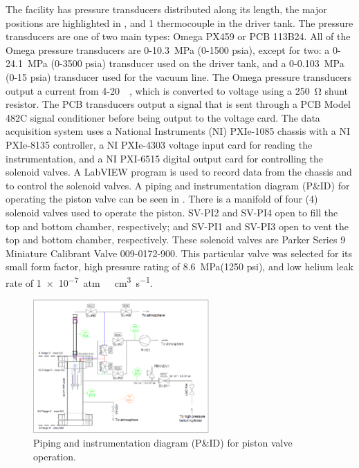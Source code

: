 The facility has pressure transducers distributed along its length, the major positions are highlighted in , and 1 thermocouple in the driver tank. The pressure transducers are one of two main types: Omega PX459 or PCB 113B24. All of the Omega pressure transducers are 0-\SI{10.3}{\mega\pascal} (0-1500 psia), except for two: a 0-\SI{24.1}{\mega\pascal} (0-3500 psia) transducer used on the driver tank, and a 0-\SI{0.103}{\mega\pascal} (0-15 psia) transducer used for the vacuum line. The Omega pressure transducers output a current from 4-\SI{20}{\milli\amp}, which is converted to voltage using a \SI{250}{\ohm} shunt resistor. The PCB transducers output a signal that is sent through a PCB Model 482C signal conditioner before being output to the voltage card. The data acquisition system uses a National Instruments (NI) PXIe-1085 chassis with a NI PXIe-8135 controller, a NI PXIe-4303 voltage input card for reading the instrumentation, and a NI PXI-6515 digital output card for controlling the solenoid valves. A LabVIEW program is used to record data from the chassis and to control the solenoid valves. A piping and instrumentation diagram (P\&ID) for operating the piston valve can be seen in . There is a manifold of four (4) solenoid valves used to operate the piston. SV-PI2 and SV-PI4 open to fill the top and bottom chamber, respectively; and SV-PI1 and SV-PI3 open to vent the top and bottom chamber, respectively. These solenoid valves are Parker Series 9 Miniature Calibrant Valve 009-0172-900. This particular valve was selected for its small form factor, high pressure rating of \SI{8.6}{\mega\pascal}(1250 psi), and low helium leak rate of \SI{1e-7}{atm\ \centi\meter^3\per\second}.



%
\begin{figure}[htbp]
    \vspace{16pt}
    \centering
    \includegraphics[width=0.6\textwidth]{experiment/photos/HENRI_valve_PID.PNG}
    \caption{Piping and instrumentation diagram (P\&ID) for piston valve operation.}
    \label{fig:sv pid}
    \vspace{16pt}
\end{figure}
%




